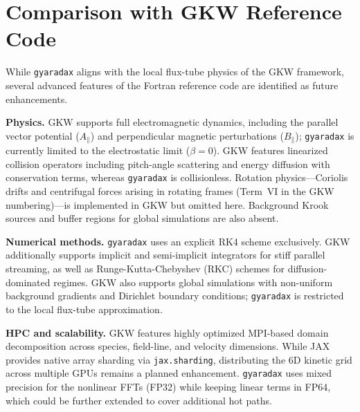 \documentclass{article}
\theoremstyle{plain}
\theoremstyle{definition}
\theoremstyle{remark}
\begin{document}

\section{Comparison with GKW Reference Code}
\label{app:gkw_comparison}

While \texttt{gyaradax} aligns with the local flux-tube physics of the GKW framework, several advanced features of the Fortran reference code are identified as future enhancements.

\textbf{Physics.}
GKW supports full electromagnetic dynamics, including the parallel vector potential ($A_\parallel$) and perpendicular magnetic perturbations ($B_\parallel$); \texttt{gyaradax} is currently limited to the electrostatic limit ($\beta = 0$). GKW features linearized collision operators including pitch-angle scattering and energy diffusion with conservation terms, whereas \texttt{gyaradax} is collisionless. Rotation physics---Coriolis drifts and centrifugal forces arising in rotating frames (Term~VI in the GKW numbering)---is implemented in GKW but omitted here. Background Krook sources and buffer regions for global simulations are also absent.

\textbf{Numerical methods.}
\texttt{gyaradax} uses an explicit RK4 scheme exclusively. GKW additionally supports implicit and semi-implicit integrators for stiff parallel streaming, as well as Runge-Kutta-Chebyshev (RKC) schemes for diffusion-dominated regimes. GKW also supports global simulations with non-uniform background gradients and Dirichlet boundary conditions; \texttt{gyaradax} is restricted to the local flux-tube approximation.

\textbf{HPC and scalability.}
GKW features highly optimized MPI-based domain decomposition across species, field-line, and velocity dimensions. While JAX provides native array sharding via \texttt{jax.sharding}, distributing the 6D kinetic grid across multiple GPUs remains a planned enhancement. \texttt{gyaradax} uses mixed precision for the nonlinear FFTs (FP32) while keeping linear terms in FP64, which could be further extended to cover additional hot paths.



\end{document}
